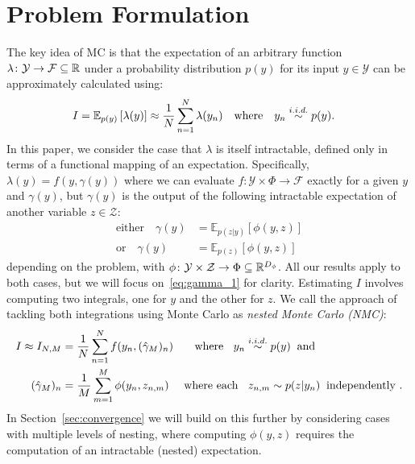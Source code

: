 
\section{Problem Formulation}
\label{sec:prob-form}

The key idea of MC is that the expectation of an arbitrary function 
$\lambda \colon \mathcal{Y} \rightarrow \mathcal{F} \subseteq \mathbb{R}$ under a probability distribution $p(y)$ for its input $y \in \mathcal{Y}$ can be approximately calculated using:
\begin{align}
\label{eq:MC}
I &= \mathbb{E}_{p(y)} \left[\lambda(y)\right]
\approx \frac{1}{N} \sum_{n=1}^{N} \lambda(y_n) \quad \text{where} \quad y_n \overset{i.i.d.}{\sim} p(y).
\end{align}
In this paper, we consider the case that $\lambda$ is itself intractable, defined only in terms of a functional mapping of an expectation. Specifically, $\lambda(y) = f(y,\gamma(y))$
where we can evaluate $f \colon \mathcal{Y} \times \Phi \rightarrow \mathcal{F}$ exactly for a given $y$ and $\gamma (y)$, but $\gamma(y)$ is the output of the following 
intractable expectation of another variable $z \in \mathcal{Z}$:
\begin{subequations}
	\label{eq:gamma}
	\begin{align}
	\label{eq:gamma_1}
	\text{either}\quad
	\gamma(y) &=  \mathbb{E}_{p(z | y)} \left[\phi(y,z)\right] \\
	\label{eq:gamma_2}
	\text{or} \quad \gamma(y) &= \mathbb{E}_{p(z)} \left[\phi(y,z)\right]
	\end{align}
\end{subequations}
depending on the problem, with $\phi \colon \mathcal{Y} \times \mathcal{Z} \rightarrow \Phi \subseteq \mathbb{R}^{D_{\phi}}$.
All our results apply to both cases, but we will focus on~\eqref{eq:gamma_1} for clarity.
Estimating $I$ involves computing two integrals, one for $y$ and the other for $z$. 
We call the approach of tackling both integrations using Monte Carlo 
as \emph{nested Monte Carlo (NMC)}:
\begin{subequations}
\label{eq:nested-mc}
\begin{align}
I \approx I_{N,M} &= \frac{1}{N}  \sum_{n=1}^{N} f(y_n,(\hat{\gamma}_M)_n) \label{eq:nested-outer} \quad \;\;  \text{ where } \;\; y_n \overset{i.i.d.}{\sim} p(y) \;\;  \text{and} \\
(\hat{\gamma}_M)_n &= \frac{1}{M}  \sum_{m=1}^{M}  \phi(y_n,z_{n,m}) \label{eq:nested-inner} \quad
\text{ where each } \;\; z_{n,m} \sim p(z | y_n) \;\; \text{independently }.
\end{align}
\end{subequations}
In Section~\ref{sec:convergence} we will build on this further by considering cases with multiple
levels of nesting, where computing $\phi(y,z)$ requires the computation of an intractable (nested) expectation.


